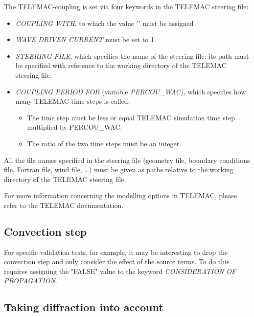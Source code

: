  The TELEMAC-\tomawac coupling is set via four keywords in the TELEMAC steering file:

\begin{itemize}
\item  \textit{COUPLING WITH}, to which the value '\tomawac' must be assigned

\item  \textit{WAVE DRIVEN CURRENT} must be set to 1

\item  \textit{\tomawac STEERING FILE}, which specifies the name of the \tomawac steering file: its path must be specified with reference to the working directory of the TELEMAC steering file.

\item  \textit{COUPLING PERIOD FOR \tomawac} (variable \textit{PERCOU\_WAC),} which specifies how many TELEMAC time steps \tomawac is called:

\begin{itemize}
\item  The \tomawac time step must be less or equal TELEMAC simulation time step multiplied by PERCOU\_WAC.

\item  The ratio of the two time steps must be an integer.
\end{itemize}
\end{itemize}

 All the file names specified in the \tomawac steering file (geometry file, boundary conditions file, Fortran file, wind file, \dots ) must be given as paths relative to the working directory of the TELEMAC steering file.

 For more information concerning the modelling options in TELEMAC, please refer to the TELEMAC documentation.

\subsection{ Convection step}

 For specific validation tests, for example, it may be interesting to drop the convection step and only consider the effect of the source terms. To do this requires assigning the "FALSE" value to the keyword \textit{CONSIDERATION OF PROPAGATION}.


\subsection{ Taking diffraction into account}

